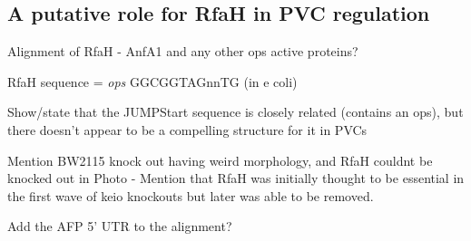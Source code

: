 %







\subsection{A putative role for RfaH in PVC regulation}

Alignment of RfaH - AnfA1 and any other ops active proteins?

RfaH sequence = \emph{ops} GGCGGTAGnnTG (in e coli) \citep{Sevostyanova2008, Artsimovitch2002}

Show/state that the JUMPStart sequence is closely related (contains an ops), but there doesn't appear to be a compelling structure for it in PVCs

Mention BW2115 knock out having weird morphology, and RfaH couldnt be knocked out in Photo
 - Mention that RfaH was initially thought to be essential in the first wave of keio knockouts but later was able to be removed.

Add the AFP 5' UTR to the alignment?

